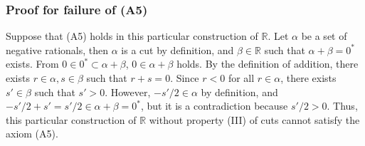 \documentclass{scrartcl}
\begin{document}
\subsubsection{Proof for failure of (A5)}
Suppose that (A5) holds in this particular construction of \(\mathbb{R}\).
Let \(\alpha\) be a set of negative rationals, then \(\alpha\) is a cut by definition, and \(\beta \in \mathbb{R}\) such that \(\alpha + \beta = 0^*\) exists.
From \(0 \in 0^* \subset \alpha + \beta\), \(0 \in \alpha + \beta\) holds.
By the definition of addition, there exists \(r \in \alpha, s \in \beta\) such that \(r + s = 0\).
Since \(r < 0\) for all \(r \in \alpha\), there exists \(s' \in \beta\) such that \(s' > 0\).
However, \(-s' / 2 \in \alpha\) by definition, and \(-s' / 2 + s' = s' / 2 \in \alpha + \beta = 0^*\), but it is a contradiction because \(s' / 2 > 0\).
Thus, this particular construction of \(\mathbb{R}\) without property (III) of cuts cannot satisfy the axiom (A5).
\end{document}
